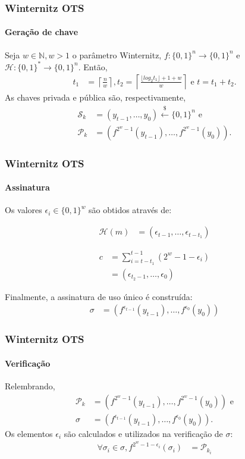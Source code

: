 \documentclass[12pt]{beamer}
\newcommand{\hash}[2][]{f^{#1}(#2)}
\begin{document}
\begin{frame}
  \frametitle{Winternitz OTS}
  \framesubtitle{Geração de chave}
  Seja $w \in \mathbb{N}, w > 1$ o parâmetro Winternitz,
  $f : \{0, 1\}^{n} \longrightarrow \{0, 1\}^{n}$
  e $\mathcal{H} : \{0, 1\}^{*} \longrightarrow \{0, 1\}^{n}$. Então,
   \begin{align*}
       t_1 &= \left\lceil \frac{n}{w} \right\rceil, t_2 = \left\lceil
       \frac{\lfloor log_2 t_1 \rfloor + 1 + w}{w} \right\rceil \text{ e } t = t_1 + t_2.
   \end{align*}
   As chaves privada e pública são, respectivamente,
   \begin{align*}
      \mathcal{S}_k &= (y_{t - 1}, \dots, y_{0})
        \stackrel{\$}{\longleftarrow} \{0,1\}^n \text{ e}\\
      \mathcal{P}_k &= (\hash[2^w - 1]{y_{t - 1}}, \dots, \hash[2^w - 1]{y_0}).
   \end{align*}
\end{frame}

\begin{frame}
  \frametitle{Winternitz OTS}
  \framesubtitle{Assinatura}
  Os valores $\epsilon_i \in \{0, 1\}^w$ são obtidos através de:
  
  \begin{minipage}{.45\linewidth}
  \begin{align*}
    \mathcal{H}(m) &= (\epsilon_{t - 1}, \dots, \epsilon_{t - t_1})
  \end{align*}
  \end{minipage}
  \begin{minipage}{.45\linewidth}
  \begin{align*}
    c &= \sum_{i = t - t_1}^{t - 1} (2^w - 1 - \epsilon_i) \\
      &= (\epsilon_{t_2 - 1}, \dots, \epsilon_{0})
  \end{align*}
  \end{minipage}
  \vspace{4mm}
  
  Finalmente, a assinatura de uso único é construída:
  \begin{align*}
    \sigma &= (f^{\epsilon_{t - 1}}(y_{t - 1}), \dots, f^{\epsilon_0}(y_0))
  \end{align*}
\end{frame}

\begin{frame}
  \frametitle{Winternitz OTS}
  \framesubtitle{Verificação}
  Relembrando,
  \begin{align*}
    \mathcal{P}_k &= (\hash[2^w - 1]{y_{t - 1}}, \dots, \hash[2^w - 1]{y_0}) \text{ e} \\
    \sigma &= (f^{\epsilon_{t - 1}}(y_{t - 1}), \dots, f^{\epsilon_0}(y_0)).
  \end{align*}
  Os elementos $\epsilon_i$ são calculados e utilizados na verificação de $\sigma$:
  \begin{align*}
    \forall \sigma_i \in \sigma, \hash[2^w - 1 - \epsilon_{i}]{\sigma_i} &= \mathcal{P}_{k_i}
  \end{align*}
\end{frame}
\end{document}
